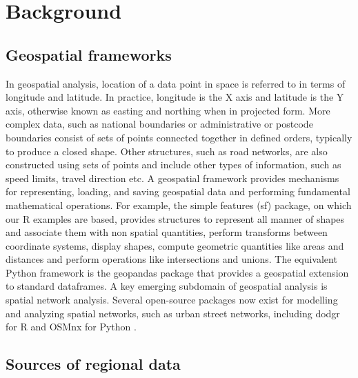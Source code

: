 \documentclass[utf8]{frontiersHLTH}
\begin{document}
\section{Background}\label{background}

\subsection{Geospatial frameworks}\label{geospatial-frameworks}

In geospatial analysis, location of a data point in space is referred to
in terms of longitude and latitude. In practice, longitude is the X
axis and latitude is the Y axis, otherwise known as easting and
northing when in projected form. More complex data, such as
national boundaries or administrative or postcode boundaries consist
of sets of points connected together in defined orders, typically to
produce a closed shape. Other structures, such as road networks, are
also constructed using sets of points and include other types of
information, such as speed limits, travel direction etc. A geospatial
framework provides mechanisms for representing, loading, and saving
geospatial data and performing fundamental mathematical
operations. For example, the simple features (sf) \cite{Pebesma_2018}
package, on which our R examples are based, provides structures to
represent all manner of shapes and associate them with non spatial
quantities, perform transforms between coordinate systems, display
shapes, compute geometric quantities like areas and distances and
perform operations like intersections and unions. The equivalent
Python framework is the geopandas package that provides a geospatial
extension to standard dataframes. A key emerging subdomain of 
geospatial analysis is spatial network analysis. Several open-source 
packages now exist for modelling and analyzing spatial networks, 
such as urban street networks, including dodgr for R \cite{Padgham_2019}
and OSMnx for Python \cite{boeing_osmnx_2017}.

\subsection{Sources of regional data}\label{sources-of-regional-data}
\end{document}
